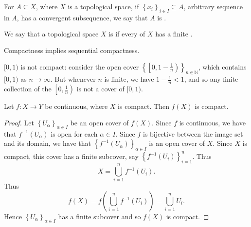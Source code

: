 \documentclass[notoc,notitlepage]{tufte-book}
\begin{document}
\begin{defn}\label{defn:sequential_compactness}
  For $A \subseteq X$, where $X$ is a topological space, if
  $\left\{ x_i \right\}_{i \in I} \subseteq A$, arbitrary sequence in $A$, has a
  convergent subsequence, we say that $A$ is .
\end{defn}

\begin{defn}[Compactness]\label{defn:compactness}
  We say that a topological space $X$ is  if every 
  of $X$ has a finite .
\end{defn}

\begin{lemma}\label{lemma:compactness_implies_sequential_compactness}
  Compactness implies sequential compactness.
\end{lemma}

\begin{eg}
  $[ 0, 1 )$ is not compact: consider the open cover
  $\left\{ \left[ 0, 1 - \frac{1}{n} \right) \right\}_{n \in \mathbb{N}}$, which contains
  $[0, 1)$ as $n \to \infty$. But whenever $n$ is finite, we have $1 - \frac{1}{n} < 1$,
  and so any finite collection of the $\left[0, \frac{1}{n}\right)$ is not a cover of
  $[0, 1)$.
\end{eg}

\begin{thm}\label{thm:continuous_maps_map_compact_sets_to_compact_images}
  Let $f : X \to Y$ be continuous, where $X$ is compact. Then $f(X)$ is compact.
\end{thm}

\begin{proof}
  Let $\left\{ U_\alpha \right\}_{\alpha \in I}$ be an open cover of $f(X)$. Since
  $f$ is continuous, we have that $f^{-1} \left( U_\alpha \right)$ is open for each
  $\alpha \in I$. Since $f$ is bijective between the image set and its domain, we
  have that $\left\{ f^{-1} \left( U_\alpha \right) \right\}_{\alpha \in I}$ is an
  open cover of $X$. Since $X$ is compact, this cover has a finite subcover, say
  $\left\{ f^{-1} \left( U_i \right) \right\}_{i = 1}^{n}$. Thus
  \begin{equation*}
    X = \bigcup_{i=1}^{n} f^{-1} \left( U_i \right).
  \end{equation*}
  Thus
  \begin{equation*}
    f(X) = f \left( \bigcup_{i=1}^{n} f^{-1} \left( U_i \right) \right) = \bigcup_{i=1}^{n} U_i.
  \end{equation*}
  Hence $\left\{ U_\alpha \right\}_{\alpha \in I}$ has a finite subcover and so
  $f(X)$ is compact.
\end{proof}
\end{document}
